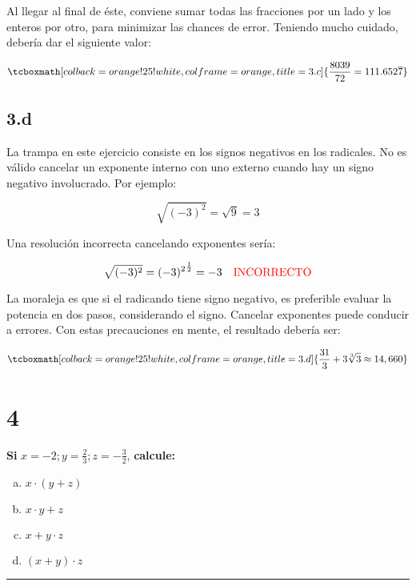 \documentclass{article}
\begin{document}
Al llegar al final de éste, conviene sumar todas las fracciones por un lado y los enteros por otro, para minimizar las chances de error. Teniendo mucho cuidado, debería dar el siguiente valor:

\begin{equation}
\tcboxmath[colback=orange!25!white,colframe=orange, title=3.c] { \frac{8039}{72} = 111.652\overline{7} }
\end{equation}

\subsection*{3.d}
\label{subsec:3.d}

La trampa en este ejercicio consiste en los signos negativos en los radicales. No es válido cancelar un exponente interno con uno externo cuando hay un signo negativo involucrado. Por ejemplo:

\begin{equation}
\sqrt{(-3)^2} = \sqrt{9} = 3
\end{equation}

Una resolución incorrecta cancelando exponentes sería:

\begin{equation}
\sqrt{(-3)^2} = {(-3)^2}^{\frac{1}{2}} = -3 \quad \textcolor{red}{\text{INCORRECTO}}
\end{equation}

La moraleja es que si el radicando tiene signo negativo, es preferible evaluar la potencia en dos pasos, considerando el signo. Cancelar exponentes puede conducir a errores. Con estas precauciones en mente, el resultado debería ser:

\begin{equation}
\tcboxmath[colback=orange!25!white,colframe=orange, title=3.d] { \frac{31}{3} + 3 \sqrt[3]{3} \approx 14,660 }
\end{equation}

\section*{4}
\label{sec:4}

\textbf{Si } $x = -2; y = \frac{2}{3}; z = -\frac{3}{2}$, \textbf{calcule:}

\begin{enumerate}[(a)]
\bfseries

\item $ x \cdot (y + z) $

\item $ x \cdot y + z $

\item $ x + y \cdot z $

\item $ (x + y) \cdot z $

\end{enumerate}
\hrule
\end{document}
